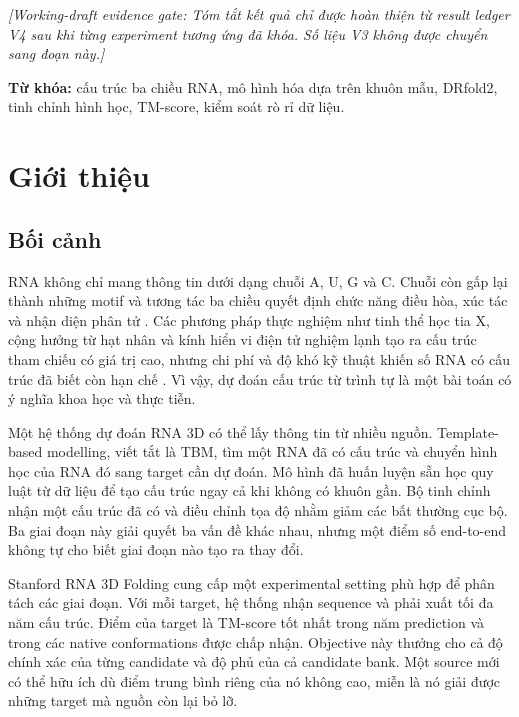\documentclass[12pt,a4paper,oneside]{report}
\newcommand{\evidencepending}[1]{\textcolor{evidencegray}{\textit{[Working-draft evidence gate: #1]}}}
\begin{document}
\evidencepending{Tóm tắt kết quả chỉ được hoàn thiện từ result ledger V4 sau khi từng
experiment tương ứng đã khóa. Số liệu V3 không được chuyển sang đoạn này.}

\noindent\textbf{Từ khóa:} cấu trúc ba chiều RNA, mô hình hóa dựa trên khuôn mẫu,
DRfold2, tinh chỉnh hình học, TM-score, kiểm soát rò rỉ dữ liệu.

\tableofcontents
\listoftables
\clearpage
{}

\chapter{Giới thiệu}

\section{Bối cảnh}

RNA không chỉ mang thông tin dưới dạng chuỗi A, U, G và C. Chuỗi còn gấp lại thành
những motif và tương tác ba chiều quyết định chức năng điều hòa, xúc tác và nhận diện
phân tử \cite{cao_rna_functions,tinoco_folding,butcher_tertiary}. Các phương pháp thực
nghiệm như tinh thể học tia X, cộng hưởng từ hạt nhân và kính hiển vi điện tử nghiệm
lạnh tạo ra cấu trúc tham chiếu có giá trị cao, nhưng chi phí và độ khó kỹ thuật khiến
số RNA có cấu trúc đã biết còn hạn chế \cite{zhang_experimental_review,ma_cryoem}.
Vì vậy, dự đoán cấu trúc từ trình tự là một bài toán có ý nghĩa khoa học và thực tiễn.

Một hệ thống dự đoán RNA 3D có thể lấy thông tin từ nhiều nguồn. Template-based
modelling, viết tắt là TBM, tìm một RNA đã có cấu trúc và chuyển hình học của RNA đó
sang target cần dự đoán. Mô hình đã huấn luyện sẵn học quy luật từ dữ liệu để tạo cấu
trúc ngay cả khi không có khuôn gần. Bộ tinh chỉnh nhận một cấu trúc đã có và điều
chỉnh tọa độ nhằm giảm các bất thường cục bộ. Ba giai đoạn này giải quyết ba vấn đề
khác nhau, nhưng một điểm số end-to-end không tự cho biết giai đoạn nào tạo ra thay đổi.

Stanford RNA 3D Folding cung cấp một experimental setting phù hợp để phân tách các giai
đoạn. Với mỗi target, hệ thống nhận sequence và phải xuất tối đa năm cấu trúc. Điểm của
target là TM-score tốt nhất trong năm prediction và trong các native conformations
được chấp nhận. Objective này thưởng cho cả độ chính xác của từng candidate và độ phủ
của cả candidate bank. Một source mới có thể hữu ích dù điểm trung bình riêng của nó
không cao, miễn là nó giải được những target mà nguồn còn lại bỏ lỡ.
\end{document}
